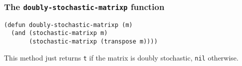 \subsubsection{The {\tt doubly-stochastic-matrixp} function}
\label{subsubsec:doubly-stochastic-matrixp}
\begin{verbatim}
(defun doubly-stochastic-matrixp (m)
  (and (stochastic-matrixp m)
       (stochastic-matrixp (transpose m))))
\end{verbatim}
This method just returns {\tt t} if the matrix is doubly stochastic,
{\tt nil} otherwise.

